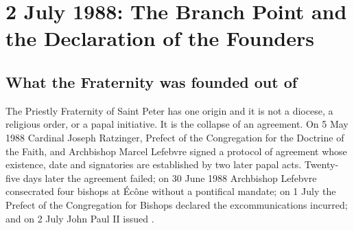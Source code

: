 \section{2 July 1988: The Branch Point and the Declaration of the Founders}

\subsection{What the Fraternity was founded out of}

The Priestly Fraternity of Saint Peter has one origin and it is not a
diocese, a religious order, or a papal initiative. It is the collapse of
an agreement. On 5 May 1988 Cardinal Joseph Ratzinger, Prefect of the
Congregation for the Doctrine of the Faith, and Archbishop Marcel
Lefebvre signed a protocol of agreement whose existence, date and
signatories are established by two later papal acts. Twenty-five days later the agreement
failed; on 30 June 1988 Archbishop Lefebvre consecrated four bishops at
Écône without a pontifical mandate; on 1 July the Prefect of the
Congregation for Bishops declared the excommunications incurred; and on
2 July John Paul II issued .

